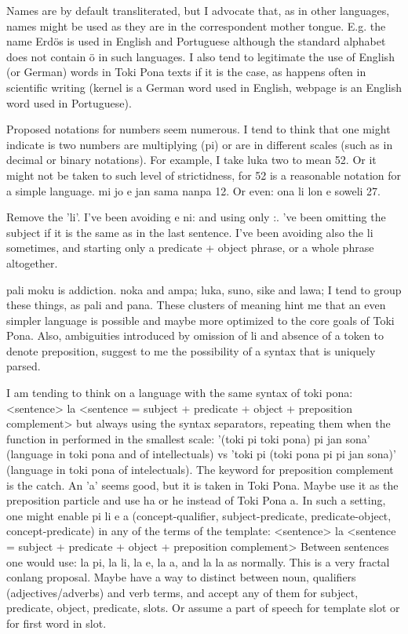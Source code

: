 \documentclass{article}
\begin{document}
Names are by default transliterated,
but I advocate that, as in other languages,
names might be used as they are in the
correspondent mother tongue.
E.g. the name Erdös is used in
English and Portuguese although the standard
alphabet does not contain ö in such languages.
I also tend to legitimate the use of English (or German) words
in Toki Pona texts if it is the case,
as happens often in scientific writing
(kernel is a German word used in English,
webpage is an English word used in Portuguese).

Proposed notations for numbers seem numerous.
I tend to think that one might indicate is two numbers
are multiplying (pi) or are in different scales
(such as in decimal or binary notations).
For example, I take luka two to mean 52.
Or it might not be taken to such level of strictidness,
for 52 is a reasonable notation for a simple language.
mi jo e jan sama nanpa 12.
Or even:
ona li lon e soweli 27.

Remove the 'li'.
I've been avoiding e ni: and using only :.
've been omitting the subject if it is the
same as in the last sentence.
I've been avoiding also the li sometimes,
and starting only a predicate + object phrase,
or a whole phrase altogether.

pali moku is addiction.
noka and ampa; luka, suno, sike and lawa;
I tend to group these things, as pali and pana.
These clusters of meaning hint me that an even simpler
language is possible and maybe more optimized to the
core goals of Toki Pona.
Also, ambiguities introduced by omission of li
and absence of a token to denote preposition,
suggest to me the possibility of a syntax that is uniquely
parsed.

I am tending to think on a language with the same syntax of toki pona:
<sentence> la <sentence = subject + predicate + object + preposition complement>
but always using the syntax separators,
repeating them when the function in performed in the smallest scale:
'(toki pi toki pona) pi jan sona' (language in toki pona and of intellectuals) vs
'toki pi (toki pona pi pi jan sona)' (language in toki pona of intelectuals).
The keyword for preposition complement is the catch.
An 'a' seems good, but it is taken in Toki Pona.
Maybe use it as the preposition particle and use ha or he
instead of Toki Pona a.
In such a setting,
one might enable pi li e a (concept-qualifier, subject-predicate,
predicate-object, concept-predicate)
in any of the terms of the template:
<sentence> la <sentence = subject + predicate + object + preposition complement>
Between sentences one would use:
la pi, la li, la e, la a, and la la as normally.
This is a very fractal conlang proposal.
Maybe have a way to distinct between noun, qualifiers (adjectives/adverbs) and verb terms,
and accept any of them for subject, predicate, object, predicate,
slots. Or assume a part of speech for template slot or for first word in slot.
\end{document}
